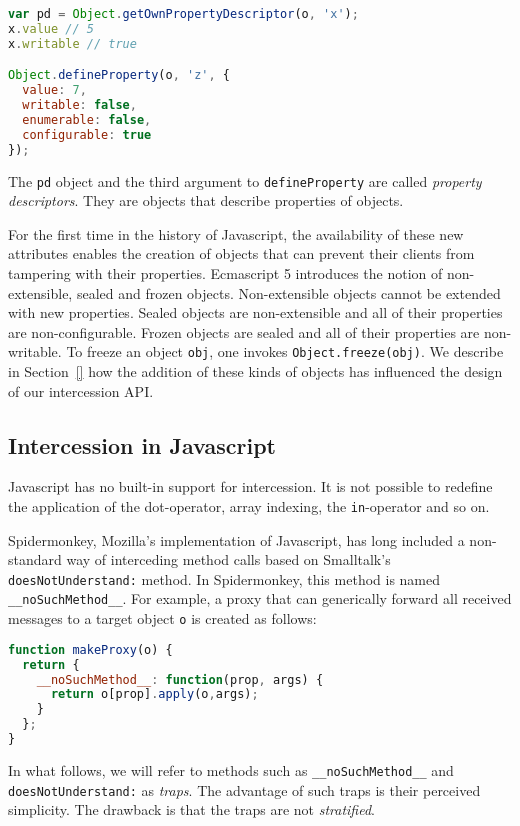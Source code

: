 \documentclass{acm_proc_article-sp}
\begin{document}
\begin{lstlisting}[language=javascript]
var pd = Object.getOwnPropertyDescriptor(o, 'x');
x.value // 5
x.writable // true

Object.defineProperty(o, 'z', {
  value: 7,
  writable: false,
  enumerable: false,
  configurable: true
});
\end{lstlisting}

The \texttt{pd} object and the third argument to \texttt{defineProperty} are called \emph{property descriptors}. They are objects that describe properties of objects.

For the first time in the history of Javascript, the availability of these new attributes enables the creation of objects that can prevent their clients from tampering with their properties. Ecmascript 5 introduces the notion of non-extensible, sealed and frozen objects. Non-extensible objects cannot be extended with new properties. Sealed objects are non-extensible and all of their properties are non-configurable. Frozen objects are sealed and all of their properties are non-writable. To freeze an object \texttt{obj}, one invokes \texttt{Object.freeze(obj)}. We describe in Section~\ref{} how the addition of these kinds of objects has influenced the design of our intercession API.

\subsection{Intercession in Javascript}
\label{sub:intercession_in_javascript}

Javascript has no built-in support for intercession. It is not possible to redefine the application of the dot-operator, array indexing, the \texttt{in}-operator and so on.

Spidermonkey, Mozilla's implementation of Javascript, has long included a non-standard way of interceding method calls based on Smalltalk's \texttt{doesNotUnderstand:} method. In Spidermonkey, this method is named \lstinline{__noSuchMethod__}. For example, a proxy that can generically forward all received messages to a target object \texttt{o} is created as follows:

\begin{lstlisting}[language=javascript]
function makeProxy(o) {
  return {
    __noSuchMethod__: function(prop, args) {
      return o[prop].apply(o,args);
    }
  };
}
\end{lstlisting}

In what follows, we will refer to methods such as \texttt{__noSuchMethod__} and \texttt{doesNotUnderstand:} as \emph{traps}. The advantage of such traps is their perceived simplicity. The drawback is that the traps are not \emph{stratified}.
\end{document}
